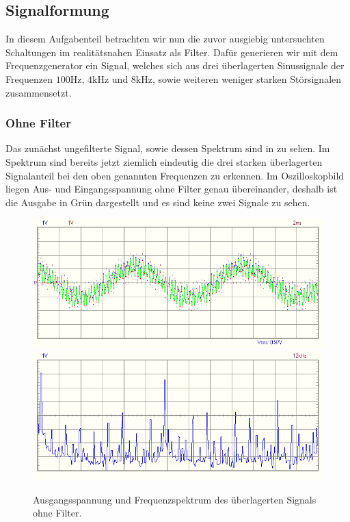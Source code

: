 \subsection{Signalformung}

In diesem Aufgabenteil betrachten wir nun die zuvor ausgiebig untersuchten Schaltungen im realitätsnahen Einsatz als Filter. Dafür generieren wir mit dem Frequenzgenerator ein Signal, welches sich aus drei überlagerten Sinussignale der Frequenzen $100\si{\hertz}$, $4\si{\kilo\hertz}$ und $8\si{\kilo\hertz}$, sowie weiteren weniger starken Störsignalen zusammensetzt. 

\subsubsection*{Ohne Filter}

Das zunächst ungefilterte Signal, sowie dessen Spektrum sind in  zu sehen. Im Spektrum sind bereits jetzt ziemlich eindeutig die drei starken überlagerten Signalanteil bei den oben genannten Frequenzen zu erkennen. Im Oszilloskopbild liegen Aus- und Eingangsspannung ohne Filter genau übereinander, deshalb ist die Ausgabe in Grün dargestellt und es sind keine zwei Signale zu sehen.

\begin{figure}[H]
  \centering
  \includegraphics[width=.8\textwidth]{files/aufgabe8_teil1_osz.png}
  \includegraphics[width=.8\textwidth]{files/aufgabe8_teil1_spectrum.png}
  \caption{Ausgangsspannung und Frequenzspektrum des überlagerten Signals ohne Filter.}
  \label{fig:aufgabe8_teil1_osz}
\end{figure}

